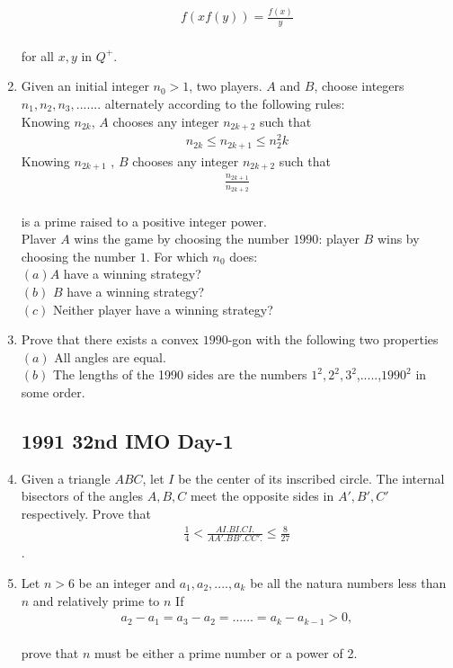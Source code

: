 \documentclass[12pt,-letter paper]{article}
\providecommand{\brak}[1]{\ensuremath{\left(#1\right)}}
\begin{document}
\begin{enumerate}
			\begin{align*}  f\brak{xf\brak{y}}= \frac{f\brak{x}}{y} \end{align*}\\ for all $x , y$ in $Q^+$.

	\item Given an initial integer $n_0 > 1$, two players. $A$ and $B$, choose integers $n_1, n_2 , n_3,.......$ alternately according to the following rules:\\
		Knowing $n_{2k}$, $A$ chooses any integer $n_{2k+2}$ such that \begin{align*} n_{2k}\leq n_{2k+1} \leq n^{2}_2{k} \end{align*}
			Knowing $n_{2k+1}$ , $B$ chooses any integer $n_{2k+2}$ such that \begin{align*}
			\frac{n_{2k+1}}{n_{2k+2}}\end{align*}\\
is a prime raised to a positive integer power.\\
		Plaver $A$ wins the game by choosing the number $1990$: player $B$ wins by choosing the number $1$. For which $n_0$ does:\\
\brak{a}$A$ have a winning strategy?\\
\brak{b} $B$ have a winning strategy?\\
\brak{c} Neither player have a winning strategy?


\item Prove that there exists a convex $1990$-gon with the following two properties\\
\brak{a} All angles are equal.\\
\brak{b} The lengths of the 1990 sides are the numbers $1^2, 2^2, 3^2$,.....,$1990^2$ in some order.

		\subsection*{1991 32nd IMO Day-1}


\item Given a triangle $ABC$, let $I$ be the center of its inscribed circle. The internal bisectors of the angles $A, B, C$ meet the opposite sides in $A', B', C'$ respectively. Prove that
	\begin{align*}\frac{1}{4} < \frac{AI. BI. CI.}{AA'. BB'. CC'.}\leq\frac{8}{27}\end{align*}. 


\item Let $n > 6$ be an integer and $a_1, a_2,....,a_k $ be all the natura numbers less than $n$ and relatively prime to $n$ If \begin{align*}
a_2-a_1=a_3-a_2=......=a_k-a_{k-1} > 0,\end{align*}\\
  prove that $n$ must be either a prime number or a power of 2.



\end{enumerate}
\end{document}
